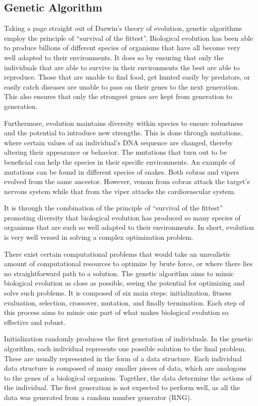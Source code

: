 \documentclass[12pt]{article}
\begin{document}
\subsection{Genetic Algorithm}

Taking a page straight out of Darwin's theory of evolution, genetic algorithms employ the principle of ``survival of the fittest''. Biological evolution has been able to produce billions \cite{Sweetlove_2011} of different species of organisms that have all become very well adapted to their environments. It does so by ensuring that only the individuals that are able to survive in their environments the best are able to reproduce. Those that are unable to find food, get hunted easily by predators, or easily catch diseases are unable to pass on their genes to the next generation. This also ensures that only the strongest genes are kept from generation to generation.

Furthermore, evolution maintains diversity within species to ensure robustness and the potential to introduce new strengths. This is done through mutations, where certain values of an individual's DNA sequence are changed, thereby altering their appearance or behavior. The mutations that turn out to be beneficial can help the species in their specific environments. An example of mutations can be found in different species of snakes. Both cobras and vipers evolved from the same ancestor. However, venom from cobras attack the target's nervous system while that from the viper attacks the cardiovascular system.

It is through the combination of the principle of ``survival of the fittest'' promoting diversity that biological evolution has produced so many species of organisms that are each so well adapted to their environments. In short, evolution is very well versed in solving a complex optimization problem.

There exist certain computational problems that would take an unrealistic amount of computational resources to optimize by brute force, or where there lies no straightforward path to a solution. The genetic algorithm aims to mimic biological evolution as close as possible, seeing the potential for optimizing and solve such problems. It is composed of six main steps: initialization, fitness evaluation, selection, crossover, mutation, and finally termination. Each step of this process aims to mimic one part of what makes biological evolution so effective and robust.

Initialization randomly produces the first generation of individuals. In the genetic algorithm, each individual represents one possible solution to the final problem. These are usually represented in the form of a data structure. Each individual data structure is composed of many smaller pieces of data, which are analogous to the genes of a biological organism. Together, the data determine the actions of the individual. The first generation is not expected to perform well, as all the data was generated from a random number generator (RNG).
\end{document}
